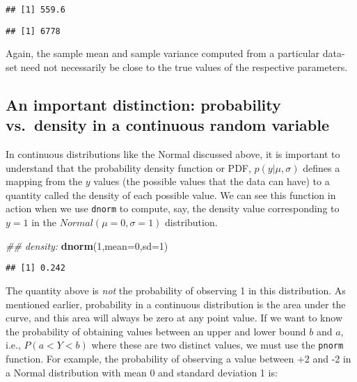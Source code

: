 \documentclass[12pt,]{krantz}
\newenvironment{Shaded}{\begin{snugshade}}{\end{snugshade}}
\newcommand{\CommentTok}[1]{\textcolor[rgb]{0.56,0.35,0.01}{\textit{#1}}}
\newcommand{\DataTypeTok}[1]{\textcolor[rgb]{0.13,0.29,0.53}{#1}}
\newcommand{\DecValTok}[1]{\textcolor[rgb]{0.00,0.00,0.81}{#1}}
\newcommand{\KeywordTok}[1]{\textcolor[rgb]{0.13,0.29,0.53}{\textbf{#1}}}
\newcommand{\NormalTok}[1]{#1}
\begin{document}
\begin{verbatim}
## [1] 559.6
\end{verbatim}

\begin{verbatim}
## [1] 6778
\end{verbatim}

Again, the sample mean and sample variance computed from a particular data-set need not necessarily be close to the true values of the respective parameters.

\hypertarget{an-important-distinction-probability-vs.density-in-a-continuous-random-variable}{%
\subsection{An important distinction: probability vs.~density in a continuous random variable}\label{an-important-distinction-probability-vs.density-in-a-continuous-random-variable}}

In continuous distributions like the Normal discussed above, it is important to understand that the probability density function or PDF, \(p(y| \mu, \sigma)\) defines a mapping from the \(y\) values (the possible values that the data can have) to a quantity called the density of each possible value. We can see this function in action when we use \texttt{dnorm} to compute, say, the density value corresponding to \(y=1\) in the \(Normal(\mu=0,\sigma=1)\) distribution.

\begin{Shaded}
\begin{Highlighting}[]
\CommentTok{## density:}
\KeywordTok{dnorm}\NormalTok{(}\DecValTok{1}\NormalTok{,}\DataTypeTok{mean=}\DecValTok{0}\NormalTok{,}\DataTypeTok{sd=}\DecValTok{1}\NormalTok{)}
\end{Highlighting}
\end{Shaded}

\begin{verbatim}
## [1] 0.242
\end{verbatim}

The quantity above is \emph{not} the probability of observing 1 in this distribution. As mentioned earlier, probability in a continuous distribution is the area under the curve, and this area will always be zero at any point value. If we want to know the probability of obtaining values between an upper and lower bound \(b\) and \(a\), i.e., \(P(a<Y<b)\) where these are two distinct values, we must use the \texttt{pnorm} function. For example, the probability of observing a value between +2 and -2 in a Normal distribution with mean 0 and standard deviation 1 is:
\end{document}
